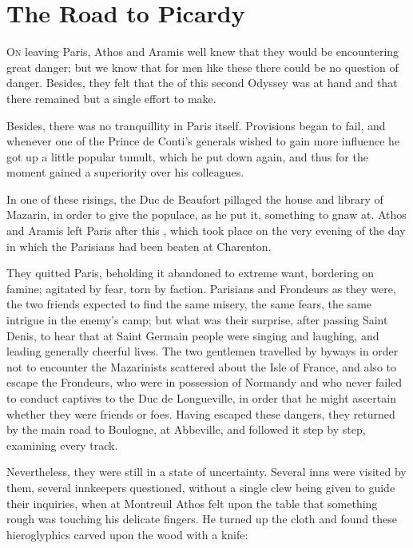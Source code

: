 \chapter{The Road to Picardy}

 \lettrine{O}{n} leaving Paris, Athos and Aramis well knew that they would be encountering great danger; but we know that for men like these there could be no question of danger. Besides, they felt that the  of this second Odyssey was at hand and that there remained but a single effort to make.

Besides, there was no tranquillity in Paris itself. Provisions began to fail, and whenever one of the Prince de Conti's generals wished to gain more influence he got up a little popular tumult, which he put down again, and thus for the moment gained a superiority over his colleagues.

In one of these risings, the Duc de Beaufort pillaged the house and library of Mazarin, in order to give the populace, as he put it, something to gnaw at. Athos and Aramis left Paris after this , which took place on the very evening of the day in which the Parisians had been beaten at Charenton.

They quitted Paris, beholding it abandoned to extreme want, bordering on famine; agitated by fear, torn by faction. Parisians and Frondeurs as they were, the two friends expected to find the same misery, the same fears, the same intrigue in the enemy's camp; but what was their surprise, after passing Saint Denis, to hear that at Saint Germain people were singing and laughing, and leading generally cheerful lives. The two gentlemen travelled by byways in order not to encounter the Mazarinists scattered about the Isle of France, and also to escape the Frondeurs, who were in possession of Normandy and who never failed to conduct captives to the Duc de Longueville, in order that he might ascertain whether they were friends or foes. Having escaped these dangers, they returned by the main road to Boulogne, at Abbeville, and followed it step by step, examining every track.

Nevertheless, they were still in a state of uncertainty. Several inns were visited by them, several innkeepers questioned, without a single clew being given to guide their inquiries, when at Montreuil Athos felt upon the table that something rough was touching his delicate fingers. He turned up the cloth and found these hieroglyphics carved upon the wood with a knife:

